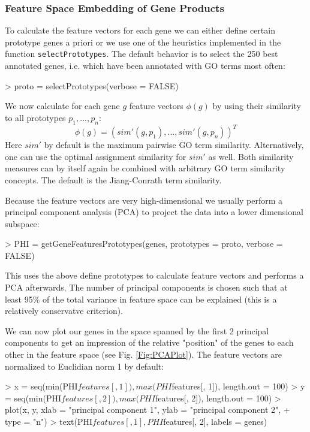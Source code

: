 \documentclass[12pt,a4paper]{article}
\begin{document}
\subsubsection{Feature Space Embedding of Gene Products}

To calculate the feature vectors for each gene we can either define certain prototype genes a priori or we use one of the heuristics implemented in the function {\tt selectPrototypes}. The default behavior is to select the 250 best annotated genes, i.e. which have been annotated with GO terms most often:
\begin{Schunk}
\begin{Sinput}
> proto = selectPrototypes(verbose = FALSE)
\end{Sinput}
\end{Schunk}

We now calculate for each gene $g$ feature vectors $\phi(g)$  by using their similarity to all prototypes $p_1,...,p_n$:
\begin{equation}
\phi(g) = (sim'(g,p_1),...,sim'(g,p_n))^T
\end{equation}
Here $sim'$ by default is the maximum pairwise GO term similarity. Alternatively, one can use the optimal assignment similarity for $sim'$ as well. Both similarity measures can by itself again be combined with arbitrary GO term similarity concepts. The default is the Jiang-Conrath term similarity.

Because the feature vectors are very high-dimensional we usually perform a principal component analysis (PCA) to project the data into a lower dimensional subspace:
\begin{Schunk}
\begin{Sinput}
> PHI = getGeneFeaturesPrototypes(genes, prototypes = proto, verbose = FALSE)
\end{Sinput}
\end{Schunk}

This uses the above define prototypes to calculate feature vectors and performs a PCA afterwards. The number of principal components is chosen such that at least 95\% of the total variance in feature space can be explained (this is a relatively conservatve criterion). 

We can now plot our genes in the space spanned by the first 2 principal components to get an impression of the relative  "position" of the genes to each other in the feature space (see Fig. \ref{Fig:PCAPlot}). The feature vectors are normalized to Euclidian norm 1 by default:
\begin{Schunk}
\begin{Sinput}
> x = seq(min(PHI$features[, 1]), max(PHI$features[, 1]), length.out = 100)
> y = seq(min(PHI$features[, 2]), max(PHI$features[, 2]), length.out = 100)
> plot(x, y, xlab = "principal component 1", ylab = "principal component 2", 
+     type = "n")
> text(PHI$features[, 1], PHI$features[, 2], labels = genes)
\end{Sinput}
\end{Schunk}
\end{document}
